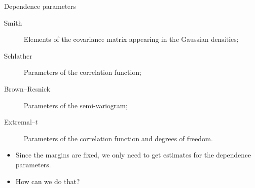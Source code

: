 \documentclass[mode=present,style=simple,paper=screen]{powerdot}
\theoremstyle{plain}%
\theoremstyle{definition}
\theoremstyle{remark}
\begin{document}
\begin{slide}[toc=]{Dependence parameters}
  \begin{description}
  \item[Smith] Elements of the covariance matrix appearing in the
    Gaussian densities;
  \item[Schlather] Parameters of the correlation function;
  \item[Brown--Resnick] Parameters of the semi-variogram;
  \item[Extremal--$t$] Parameters of the correlation function and
    degrees of freedom.
  \end{description}
  \begin{itemize}
  \item Since the margins are fixed, we only need to get estimates for
    the dependence parameters.
  \item How can we do that?
  \end{itemize}
\end{slide}
\end{document}
